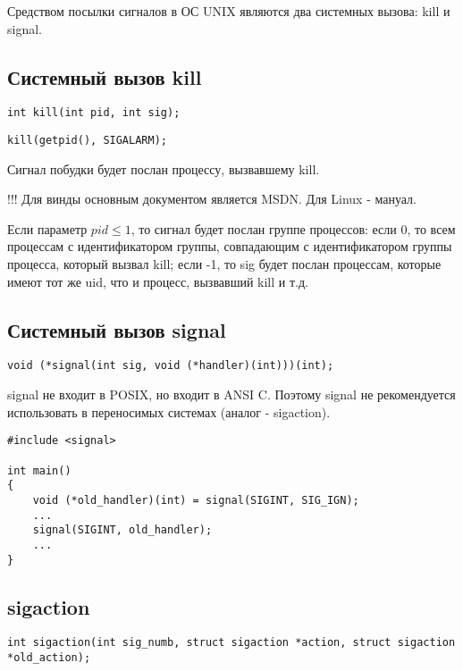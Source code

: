 \documentclass[a4paper, 12pt]{report}
\begin{document}
	Средством посылки сигналов в ОС UNIX являются два системных вызова: kill и signal.
	
	\subsection*{Системный вызов kill}

	\begin{lstlisting}
int kill(int pid, int sig);
	\end{lstlisting}
	\begin{lstlisting}
kill(getpid(), SIGALARM);
	\end{lstlisting}
	
	Сигнал побудки будет послан процессу, вызвавшему kill.
	
	!!! Для винды основным документом является MSDN. Для Linux - мануал.
	
	Если параметр $pid \le 1$, то сигнал будет послан группе процессов: если 0, то всем процессам с идентификатором группы, совпадающим с идентификатором группы процесса, который вызвал kill; если -1, то sig будет послан процессам, которые имеют тот же uid, что и процесс, вызвавший kill и т.д.
	
	\subsection*{Системный вызов signal}
	
	\begin{lstlisting}
void (*signal(int sig, void (*handler)(int)))(int);
	\end{lstlisting}

	signal не входит в POSIX, но входит в ANSI C. Поэтому signal не рекомендуется использовать в переносимых системах (аналог - sigaction).
	
	\begin{lstlisting}
#include <signal>

int main()
{
	void (*old_handler)(int) = signal(SIGINT, SIG_IGN);
	...
	signal(SIGINT, old_handler);
	...
}
	\end{lstlisting}

	\subsection*{sigaction}
	
	\begin{lstlisting}
int sigaction(int sig_numb, struct sigaction *action, struct sigaction *old_action);
	\end{lstlisting}
\end{document}
